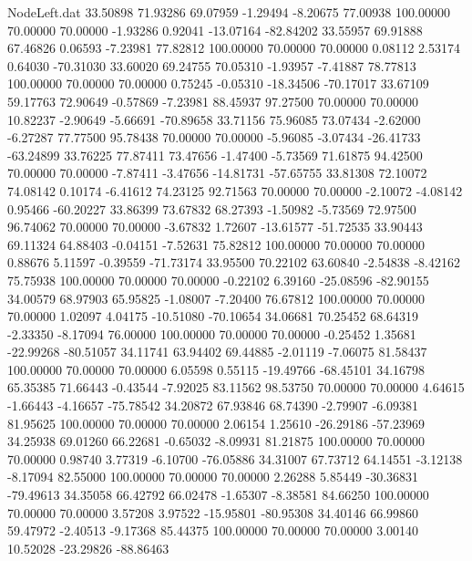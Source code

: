 \begin{filecontents}{NodeLeft.dat}
  33.50898   71.93286   69.07959    -1.29494   -8.20675   77.00938  100.00000   70.00000   70.00000   -1.93286    0.92041  -13.07164  -82.84202
  33.55957   69.91888   67.46826     0.06593   -7.23981   77.82812  100.00000   70.00000   70.00000    0.08112    2.53174    0.64030  -70.31030
  33.60020   69.24755   70.05310    -1.93957   -7.41887   78.77813  100.00000   70.00000   70.00000    0.75245   -0.05310  -18.34506  -70.17017
  33.67109   59.17763   72.90649    -0.57869   -7.23981   88.45937   97.27500   70.00000   70.00000   10.82237   -2.90649   -5.66691  -70.89658
  33.71156   75.96085   73.07434    -2.62000   -6.27287   77.77500   95.78438   70.00000   70.00000   -5.96085   -3.07434  -26.41733  -63.24899
  33.76225   77.87411   73.47656    -1.47400   -5.73569   71.61875   94.42500   70.00000   70.00000   -7.87411   -3.47656  -14.81731  -57.65755
  33.81308   72.10072   74.08142     0.10174   -6.41612   74.23125   92.71563   70.00000   70.00000   -2.10072   -4.08142    0.95466  -60.20227
  33.86399   73.67832   68.27393    -1.50982   -5.73569   72.97500   96.74062   70.00000   70.00000   -3.67832    1.72607  -13.61577  -51.72535
  33.90443   69.11324   64.88403    -0.04151   -7.52631   75.82812  100.00000   70.00000   70.00000    0.88676    5.11597   -0.39559  -71.73174
  33.95500   70.22102   63.60840    -2.54838   -8.42162   75.75938  100.00000   70.00000   70.00000   -0.22102    6.39160  -25.08596  -82.90155
  34.00579   68.97903   65.95825    -1.08007   -7.20400   76.67812  100.00000   70.00000   70.00000    1.02097    4.04175  -10.51080  -70.10654
  34.06681   70.25452   68.64319    -2.33350   -8.17094   76.00000  100.00000   70.00000   70.00000   -0.25452    1.35681  -22.99268  -80.51057
  34.11741   63.94402   69.44885    -2.01119   -7.06075   81.58437  100.00000   70.00000   70.00000    6.05598    0.55115  -19.49766  -68.45101
  34.16798   65.35385   71.66443    -0.43544   -7.92025   83.11562   98.53750   70.00000   70.00000    4.64615   -1.66443   -4.16657  -75.78542
  34.20872   67.93846   68.74390    -2.79907   -6.09381   81.95625  100.00000   70.00000   70.00000    2.06154    1.25610  -26.29186  -57.23969
  34.25938   69.01260   66.22681    -0.65032   -8.09931   81.21875  100.00000   70.00000   70.00000    0.98740    3.77319   -6.10700  -76.05886
  34.31007   67.73712   64.14551    -3.12138   -8.17094   82.55000  100.00000   70.00000   70.00000    2.26288    5.85449  -30.36831  -79.49613
  34.35058   66.42792   66.02478    -1.65307   -8.38581   84.66250  100.00000   70.00000   70.00000    3.57208    3.97522  -15.95801  -80.95308
  34.40146   66.99860   59.47972    -2.40513   -9.17368   85.44375  100.00000   70.00000   70.00000    3.00140   10.52028  -23.29826  -88.86463

\end{filecontents}

